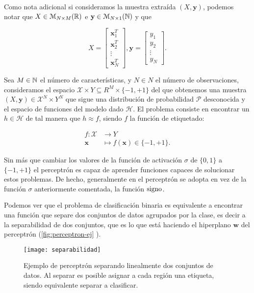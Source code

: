 Como nota adicional si consideramos la muestra extraída $(X, \textbf{y})$, podemos notar que $X \in \mathcal{M}_{N \times M}(\mathbb{R})$ e $\textbf{y} \in \mathcal{M}_{N \times 1}(\mathbb{N})$ y que

$$ X = \begin{bmatrix} \textbf{x}_1^T \\ \textbf{x}_2^T \\ \vdots \\ \textbf{x}_N^T \end{bmatrix}, \textbf{y} = \begin{bmatrix} y_1 \\ y_2 \\ \vdots \\ y_{N} \end{bmatrix}.$$

\begin{definicion}
  Sea $M \in \mathbb{N}$ el número de características, y $N \in N$ el número de observaciones, consideramos el espacio $\mathcal{X} \times Y \subseteq R^M \times \{-1, +1\}$ del que obtenemos una muestra $(X, \textbf{y}) \in \mathcal{X}^N \times Y^N$ que sigue una distribución de probabilidad $\mathcal{P}$ desconocida y el espacio de funciones del modelo dado $\mathcal{H}$. El problema consiste en encontrar un $h \in \mathcal{H}$ de tal manera que $h \approx f$, siendo $f$ la función de etiquetado:

  \begin{align*}
    f : \mathcal{X} & \to Y \\
    \textbf{x} & \mapsto f(\textbf{x}) \in \{-1, +1\}.
  \end{align*}
  \label{def:clasbin}
\end{definicion}

Sin más que cambiar los valores de la función de activación $\sigma$ de $\{0, 1\}$ a $\{-1, +1\}$ el perceptrón es capaz de aprender funciones capaces de solucionar estos problemas. De hecho, generalmente en el perceptrón se adopta en vez de la función $\sigma$ anteriormente comentada, la función $\operatorname{signo}$.

Podemos ver que el problema de clasificación binaria es equivalente a encontrar una función que separe dos conjuntos de datos agrupados por la clase, es decir a la separabilidad de dos conjuntos, que es lo que está haciendo el hiperplano $\textbf{w}$ del perceptrón (\autoref{fig:perceptron-ej} \cite{wikipedia2017separ}).

\begin{figure}[htpb]
  \centering
  \texttt{[image: separabilidad]}
  \caption{Ejemplo de perceptrón separando linealmente dos conjuntos de datos. Al separar es posible asignar a cada región una etiqueta, siendo equivalente separar a clasificar.}
  \label{fig:perceptron-ej}
\end{figure}

